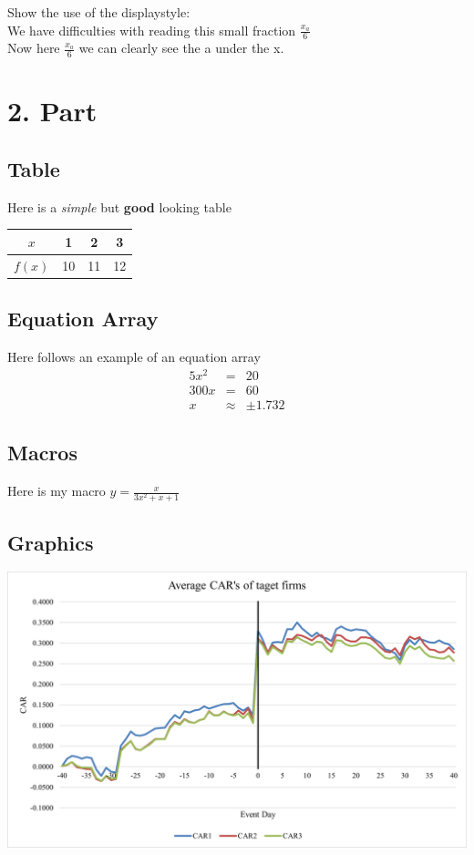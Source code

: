 \documentclass[10pt]{article}
\def\eq1{y=\frac{x}{3x^2+x+1}}
\begin{document}
Show the use of the displaystyle:\\
We have difficulties with reading this small fraction $\frac{x_a}{6}$\\
Now here $\displaystyle{\frac{x_a}{6}}$ we can clearly see the a under the x.
 
\newpage

\section{2. Part}
	\subsection{Table}
Here is a \textit{simple} but \textbf{good} looking table\\

\begin{tabular}{|c|c|c|c|}
\hline
$x$ & 1 & 2 & 3 \\ \hline
$f(x)$ & 10 & 11 & 12 \\
\hline
\end{tabular}\newline

	\subsection{Equation Array}
Here follows an example of an equation array
\begin{eqnarray}
5x^2&=&20\\
300x&=&60\\
x&\approx&\pm1.732
\end{eqnarray} \newline
 

	\subsection{Macros}
Here is my macro $\eq1$ \newline

	\subsection{Graphics}
\begin{center}	
\includegraphics[scale=0.75]{Bild1.png}
\end{center}
\end{document}
